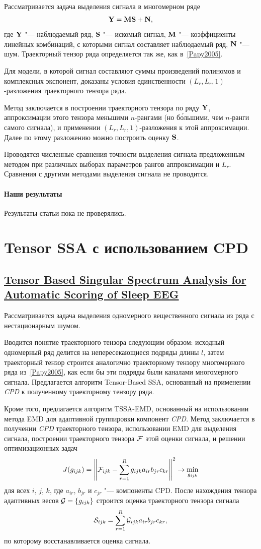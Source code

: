 \documentclass[12pt]{article}
\theoremstyle{plain}
\theoremstyle{definition}
\theoremstyle{remark}
\newcommand{\CPD}{\emph{CPD}}
\begin{document}
Рассматривается задача выделения сигнала в многомерном ряде
\[
  \mathbf{Y} = \mathbf{M} \mathbf{S} + \mathbf{N},
\]
где $\mathbf{Y}$ "--- наблюдаемый ряд, $\mathbf{S}$ "--- искомый сигнал, $\mathbf{M}$
"--- коэффициенты линейных комбинаций, с которыми сигнал составляет
наблюдаемый ряд, $\mathbf{N}$ "--- шум.
Траекторный тензор ряда определяется так же, как в~\ref{Papy2005}.

Для модели, в которой сигнал составляют суммы произведений полиномов
и комплексных экспонент, доказаны условия единственности $(L_r, L_r,
1)$-разложения траекторного тензора ряда.

Метод заключается в построении траекторного тензора по ряду $\mathbf{Y}$,
аппроксимации этого тензора меньшими $n$-рангами (но б\'{о}льшими, чем
$n$-ранги самого сигнала), и применении $(L_r, L_r, 1)$-разложения к
этой аппроксимации.
Далее по этому разложению можно построить оценку $\mathbf{S}$.

Проводятся численные сравнения точности выделения сигнала
предложенным методом при различных выборах параметров рангов
аппроксимации и $L_r$.
Сравнения с другими методами выделения сигнала не проводится.

\paragraph{Наши результаты} Результаты статьи пока не проверялись.

\section{Tensor SSA с использованием CPD}
\subsection{\href{https://doi.org/10.1109/tnsre.2014.2329557}{Tensor
    Based Singular Spectrum Analysis for Automatic Scoring of Sleep
EEG}}\label{Kouchaki2015}
Рассматривается задача выделения одномерного вещественного сигнала
из ряда с нестационарным шумом.

Вводится понятие траекторного тензора следующим образом: исходный
одномерный ряд делится на непересекающиеся подряды длины $l$, затем
траекторный тензор строится аналогично траекторному тензору
многомерного ряда из~\ref{Papy2005}, как если бы эти подряды были
каналами многомерного сигнала.
Предлагается алгоритм Tensor-Based SSA, основанный на применении \CPD{}
к полученному траекторному тензору ряда.

Кроме того, предлагается алгоритм TSSA-EMD, основанный на
использовании метода
EMD для адаптивной группировки компонент \CPD{}.
Метод заключается в получении \CPD{} траекторного тензора, использовании
EMD для выделения сигнала, построении траекторного тензора $\mathcal{F}$
этой оценки сигнала, и решении оптимизационных задач
\[
  J(g_{ijk}) = \left\|\mathcal{F}_{ijk} - \sum_{r=1}^{R}g_{ijk} a_{ir} b_{jr}
  c_{kr}\right\|^2 \to \min_{g_{ijk}}
\]
для всех $i$, $j$, $k$, где $a_{ir}$, $b_{jr}$ и $c_{jr}$ "--- компоненты CPD.
После нахождения тензора адаптивных весов $\mathcal{G}=\{g_{ijk}\}$ строится оценка
траекторного тензора сигнала
\[
  \mathcal{S}_{ijk} = \sum_{r=1}^{R}\mathcal{G}_{ijk} a_{ir} b_{jr} c_{kr},
\]
по которому восстанавливается оценка сигнала.
\end{document}
